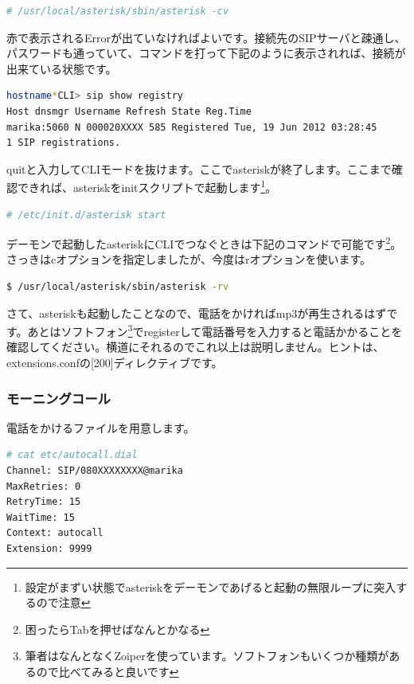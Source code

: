 \begin{lstlisting}[language=bash]
# /usr/local/asterisk/sbin/asterisk -cv
\end{lstlisting}

赤で表示されるErrorが出ていなければよいです。接続先のSIPサーバと疎通し、パスワードも通っていて、コマンドを打って下記のように表示されれば、接続が出来ている状態です。

\begin{lstlisting}[language=bash]
hostname*CLI> sip show registry 
Host dnsmgr Username Refresh State Reg.Time 
marika:5060 N 000020XXXX 585 Registered Tue, 19 Jun 2012 03:28:45
1 SIP registrations. 
\end{lstlisting}

quitと入力してCLIモードを抜けます。ここでasteriskが終了します。ここまで確認できれば、asteriskをinitスクリプトで起動します\footnote{設定がまずい状態でasteriskをデーモンであげると起動の無限ループに突入するので注意}。

\begin{lstlisting}[language=bash]
# /etc/init.d/asterisk start
\end{lstlisting}

デーモンで起動したasteriskにCLIでつなぐときは下記のコマンドで可能です\footnote{困ったらTabを押せばなんとかなる}。さっきはcオプションを指定しましたが、今度はrオプションを使います。

\begin{lstlisting}[language=bash]
$ /usr/local/asterisk/sbin/asterisk -rv
\end{lstlisting}

さて、asteriskも起動したことなので、電話をかければmp3が再生されるはずです。あとはソフトフォン\footnote{筆者はなんとなくZoiperを使っています。ソフトフォンもいくつか種類があるので比べてみると良いです}でregisterして電話番号を入力すると電話かかることを確認してください。横道にそれるのでこれ以上は説明しません。ヒントは、extensions.confの[200]ディレクティブです。

\subsubsection{モーニングコール}
電話をかけるファイルを用意します。

\begin{lstlisting}[language=bash]
# cat etc/autocall.dial 
Channel: SIP/080XXXXXXXX@marika
MaxRetries: 0
RetryTime: 15
WaitTime: 15
Context: autocall
Extension: 9999
\end{lstlisting}

